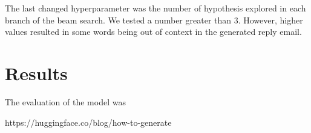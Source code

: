 \documentclass[letterpaper]{article}
\begin{document}
The last changed hyperparameter was the number of hypothesis explored in each branch of the beam search. We tested a number greater than \num{3}. However, higher values resulted in some words being out of context in the generated reply email.


\section{Results}

The evaluation of the model was 



https://huggingface.co/blog/how-to-generate





\end{document}
